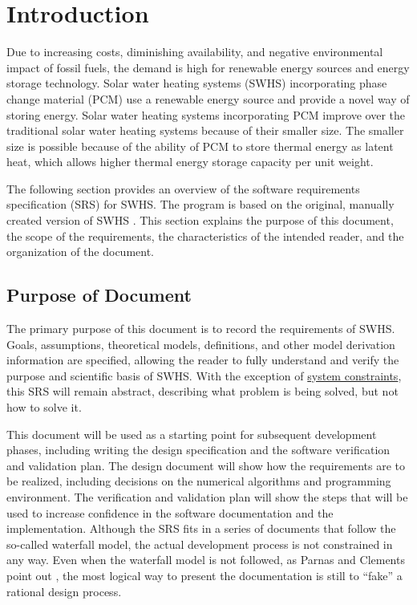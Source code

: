 \documentclass[12pt]{article}
\begin{document}
\section{Introduction}
\label{Sec:Intro}
Due to increasing costs, diminishing availability, and negative environmental impact of fossil fuels, the demand is high for renewable energy sources and energy storage technology. Solar water heating systems (SWHS) incorporating phase change material (PCM) use a renewable energy source and provide a novel way of storing energy. Solar water heating systems incorporating PCM improve over the traditional solar water heating systems because of their smaller size. The smaller size is possible because of the ability of PCM to store thermal energy as latent heat, which allows higher thermal energy storage capacity per unit weight.

The following section provides an overview of the software requirements specification (SRS) for SWHS. The program is based on the original, manually created version of SWHS \cite{swhsOriginal}. This section explains the purpose of this document, the scope of the requirements, the characteristics of the intended reader, and the organization of the document.

\subsection{Purpose of Document}
\label{Sec:DocPurpose}
The primary purpose of this document is to record the requirements of SWHS. Goals, assumptions, theoretical models, definitions, and other model derivation information are specified, allowing the reader to fully understand and verify the purpose and scientific basis of SWHS. With the exception of \hyperref[Sec:SysConstraints]{system constraints}, this SRS will remain abstract, describing what problem is being solved, but not how to solve it.

This document will be used as a starting point for subsequent development phases, including writing the design specification and the software verification and validation plan. The design document will show how the requirements are to be realized, including decisions on the numerical algorithms and programming environment. The verification and validation plan will show the steps that will be used to increase confidence in the software documentation and the implementation. Although the SRS fits in a series of documents that follow the so-called waterfall model, the actual development process is not constrained in any way. Even when the waterfall model is not followed, as Parnas and Clements point out \cite{parnasClements1986}, the most logical way to present the documentation is still to ``fake'' a rational design process.
\end{document}
